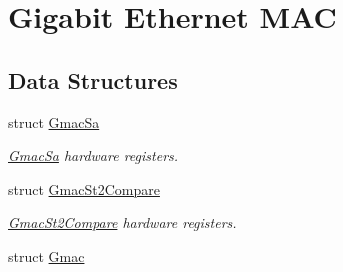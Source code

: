 \hypertarget{group__SAMV71__GMAC}{}\section{Gigabit Ethernet M\+AC}
\label{group__SAMV71__GMAC}
\subsection*{Data Structures}
\begin{DoxyCompactItemize}
\item 
struct \mbox{\hyperlink{structGmacSa}{Gmac\+Sa}}
\begin{DoxyCompactList}\small\item\em \mbox{\hyperlink{structGmacSa}{Gmac\+Sa}} hardware registers. \end{DoxyCompactList}\item 
struct \mbox{\hyperlink{structGmacSt2Compare}{Gmac\+St2\+Compare}}
\begin{DoxyCompactList}\small\item\em \mbox{\hyperlink{structGmacSt2Compare}{Gmac\+St2\+Compare}} hardware registers. \end{DoxyCompactList}\item 
struct \mbox{\hyperlink{structGmac}{Gmac}}
\end{DoxyCompactItemize}
